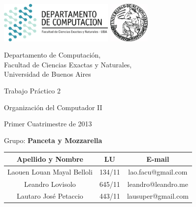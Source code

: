 \documentclass[a4paper,10pt,twoside]{article}
\begin{document}


\thispagestyle{caratula}

\begin{center}

\includegraphics[height=2cm]{DC.png} 
\hfill
\includegraphics[height=2cm]{UBA.jpg} 

\vspace{2cm}

Departamento de Computación,\\
Facultad de Ciencias Exactas y Naturales,\\
Universidad de Buenos Aires

\vspace{4cm}

\begin{Huge}
Trabajo Práctico 2
\end{Huge}

\vspace{0.5cm}

\begin{Large}
Organización del Computador II
\end{Large}

\vspace{1cm}

Primer Cuatrimestre de 2013

\vspace{4cm}

Grupo: \textbf{Panceta y Mozzarella}

\vspace{0.5cm}

\begin{tabular}{|c|c|c|}
\hline
Apellido y Nombre & LU & E-mail\\
\hline
Laouen Louan Mayal Belloli  & 134/11 & lao.facu@gmail.com\\
Leandro Lovisolo      		& 645/11 & leandro@leandro.me\\
Lautaro José Petaccio 		& 443/11 & lausuper@gmail.com\\
\hline
\end{tabular}

\end{center}
\end{document}
